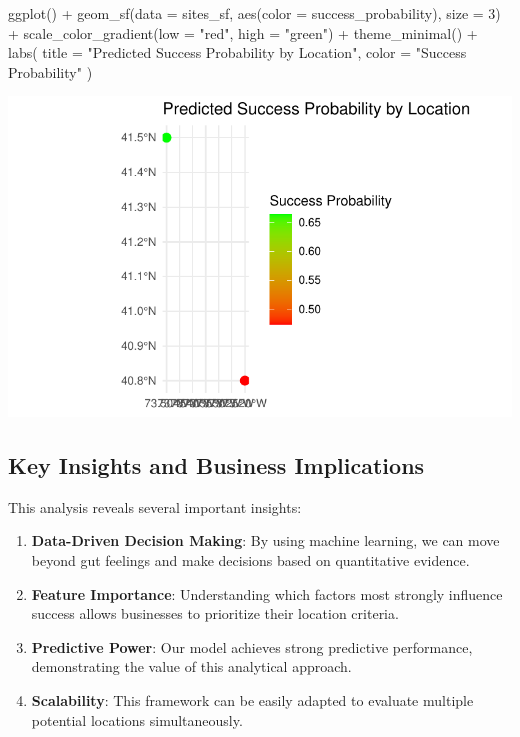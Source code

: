 \documentclass[
  letterpaper,
  DIV=11,
  numbers=noendperiod]{scrartcl}
\newenvironment{Shaded}{\begin{snugshade}}{\end{snugshade}}
\newcommand{\AttributeTok}[1]{\textcolor[rgb]{0.40,0.45,0.13}{#1}}
\newcommand{\DecValTok}[1]{\textcolor[rgb]{0.68,0.00,0.00}{#1}}
\newcommand{\FunctionTok}[1]{\textcolor[rgb]{0.28,0.35,0.67}{#1}}
\newcommand{\NormalTok}[1]{\textcolor[rgb]{0.00,0.23,0.31}{#1}}
\newcommand{\SpecialCharTok}[1]{\textcolor[rgb]{0.37,0.37,0.37}{#1}}
\newcommand{\StringTok}[1]{\textcolor[rgb]{0.13,0.47,0.30}{#1}}
\providecommand{\tightlist}{%
  \setlength{\itemsep}{0pt}\setlength{\parskip}{0pt}}\usepackage{longtable,booktabs,array}
\begin{document}
\begin{Shaded}
\begin{Highlighting}[]
\FunctionTok{ggplot}\NormalTok{() }\SpecialCharTok{+}
  \FunctionTok{geom\_sf}\NormalTok{(}\AttributeTok{data =}\NormalTok{ sites\_sf, }\FunctionTok{aes}\NormalTok{(}\AttributeTok{color =}\NormalTok{ success\_probability), }\AttributeTok{size =} \DecValTok{3}\NormalTok{) }\SpecialCharTok{+}
  \FunctionTok{scale\_color\_gradient}\NormalTok{(}\AttributeTok{low =} \StringTok{"red"}\NormalTok{, }\AttributeTok{high =} \StringTok{"green"}\NormalTok{) }\SpecialCharTok{+}
  \FunctionTok{theme\_minimal}\NormalTok{() }\SpecialCharTok{+}
  \FunctionTok{labs}\NormalTok{(}
    \AttributeTok{title =} \StringTok{"Predicted Success Probability by Location"}\NormalTok{,}
    \AttributeTok{color =} \StringTok{"Success Probability"}
\NormalTok{  )}
\end{Highlighting}
\end{Shaded}

\includegraphics{index_files/figure-pdf/predict-new-sites-1.pdf}

\subsection{Key Insights and Business
Implications}\label{key-insights-and-business-implications}

This analysis reveals several important insights:

\begin{enumerate}
\def\labelenumi{\arabic{enumi}.}
\tightlist
\item
  \textbf{Data-Driven Decision Making}: By using machine learning, we
  can move beyond gut feelings and make decisions based on quantitative
  evidence.
\item
  \textbf{Feature Importance}: Understanding which factors most strongly
  influence success allows businesses to prioritize their location
  criteria.
\item
  \textbf{Predictive Power}: Our model achieves strong predictive
  performance, demonstrating the value of this analytical approach.
\item
  \textbf{Scalability}: This framework can be easily adapted to evaluate
  multiple potential locations simultaneously.
\end{enumerate}
\end{document}
